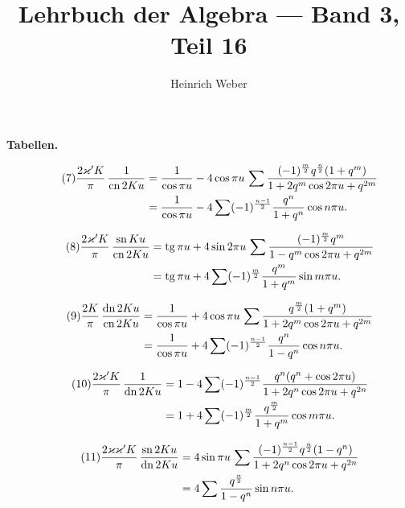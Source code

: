 \documentclass[12pt,a4paper]{article}
\title{Lehrbuch der Algebra --- Band 3, Teil 16}
\author{Heinrich Weber}
\date{}
\DeclareMathOperator{\tg}{tg}
\DeclareMathOperator{\sn}{sn}
\DeclareMathOperator{\cn}{cn}
\DeclareMathOperator{\dn}{dn}
\begin{document}
\maketitle
\thispagestyle{empty}

\newpage
\setcounter{page}{719}

\begin{center}
\large\textbf{Tabellen.}
\end{center}

\medskip

\begin{align}
\tag{7}
\frac{2\varkappa'K}{\pi}\,\frac{1}{\cn2Ku}
&= \frac{1}{\cos\pi u} - 4\cos\pi u\,\sum\frac{(-1)^{\frac{m}{2}}q^{\frac{n}{2}}(1+q^m)}{1+2q^m\cos2\pi u+q^{2m}} \notag\\
&= \frac{1}{\cos\pi u} - 4\sum(-1)^{\frac{n-1}{2}}\frac{q^n}{1+q^n}\cos n\pi u.
\end{align}

\begin{align}
\tag{8}
\frac{2\varkappa'K}{\pi}\,\frac{\sn Ku}{\cn 2Ku}
&= \tg\pi u + 4\sin2\pi u\,\sum\frac{(-1)^{\frac{m}{2}}q^m}{1-q^m\cos2\pi u+q^{2m}} \notag\\
&= \tg\pi u + 4\sum(-1)^{\frac{m}{2}}\frac{q^m}{1+q^m}\sin m\pi u.
\end{align}

\begin{align}
\tag{9}
\frac{2K}{\pi}\,\frac{\dn2Ku}{\cn2Ku}
&= \frac{1}{\cos\pi u} + 4\cos\pi u\,\sum\frac{q^{\frac{m}{2}}(1+q^m)}{1+2q^m\cos2\pi u+q^{2m}} \notag\\
&= \frac{1}{\cos\pi u} + 4\sum(-1)^{\frac{n-1}{2}}\frac{q^n}{1-q^n}\cos n\pi u.
\end{align}

\begin{align}
\tag{10}
\frac{2\varkappa'K}{\pi}\,\frac{1}{\dn2Ku}
&= 1 - 4\sum(-1)^{\frac{n-1}{2}}\frac{q^n(q^n+\cos2\pi u)}{1+2q^n\cos2\pi u+q^{2n}} \notag\\
&= 1 + 4\sum(-1)^{\frac{m}{2}}\frac{q^{\frac{m}{2}}}{1+q^m}\cos m\pi u.
\end{align}

\begin{align}
\tag{11}
\frac{2\varkappa\varkappa'K}{\pi}\,\frac{\sn2Ku}{\dn2Ku}
&= 4\sin\pi u\,\sum\frac{(-1)^{\frac{n-1}{2}}q^{\frac{n}{2}}(1-q^n)}{1+2q^n\cos2\pi u+q^{2n}} \notag\\
&= 4\sum\frac{q^{\frac{n}{2}}}{1-q^n}\sin n\pi u.
\end{align}
\end{document}
